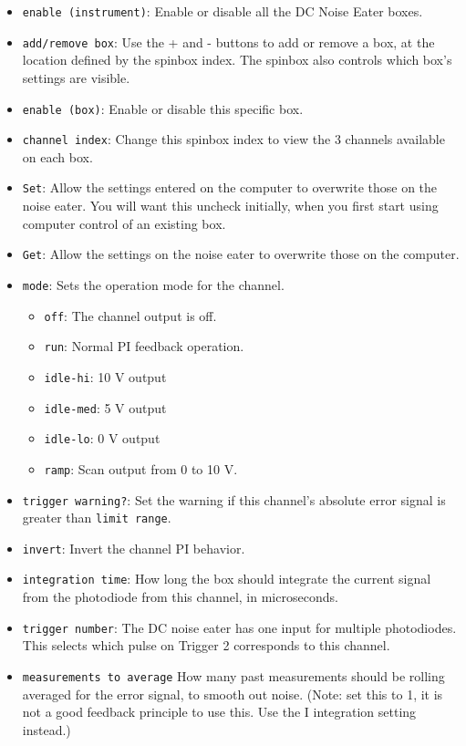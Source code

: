 \documentclass[pdftex,11pt,letterpaper]{article}
\begin{document}
\begin{itemize}
\item \texttt{enable (instrument)}:  Enable or disable all the DC Noise Eater boxes.
\item \texttt{add/remove box}:  Use the + and - buttons to add or remove a box, at the location defined by the spinbox index.  The spinbox also controls which box's settings are visible.
\item \texttt{enable (box)}: Enable or disable this specific box.
\item \texttt{channel index}:  Change this spinbox index to view the 3 channels available on each box.
\item \texttt{Set}:  Allow the settings entered on the computer to overwrite those on the noise eater.  You will want this uncheck initially, when you first start using computer control of an existing box.
\item \texttt{Get}:  Allow the settings on the noise eater to overwrite those on the computer.
\item \texttt{mode}:  Sets the operation mode for the channel.
\begin{itemize}
\item \texttt{off}:  The channel output is off.
\item \texttt{run}:  Normal PI feedback operation.
\item \texttt{idle-hi}:  10 V output
\item \texttt{idle-med}:  5 V output
\item \texttt{idle-lo}:  0 V output
\item \texttt{ramp}:  Scan output from 0 to 10 V.
\end{itemize}
\item \texttt{trigger warning?}:  Set the warning if this channel's absolute error signal is greater than \texttt{limit range}.
\item \texttt{invert}:  Invert the channel PI behavior.
\item \texttt{integration time}:  How long the box should integrate the current signal from the photodiode from this channel, in microseconds.
\item \texttt{trigger number}:  The DC noise eater has one input for multiple photodiodes.  This selects which pulse on Trigger 2 corresponds to this channel.
\item \texttt{measurements to average}  How many past measurements should be rolling averaged for the error signal, to smooth out noise.  (Note: set this to 1, it is not a good feedback principle to use this.  Use the I integration setting instead.)

\end{itemize}
\end{document}
